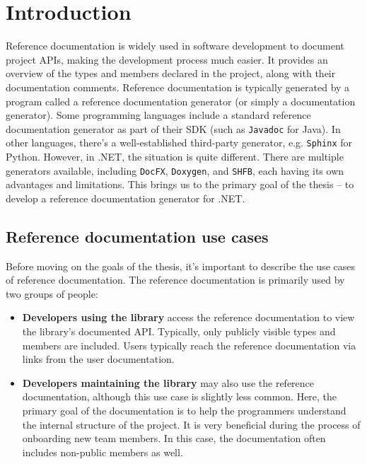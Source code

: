\chapter{Introduction}

Reference documentation is widely used in software development to document project APIs, making the development process much easier.
It provides an overview of the types and members declared in the project, along with their documentation comments.
Reference documentation is typically generated by a program called a reference documentation generator (or simply a documentation generator).
Some programming languages include a standard reference documentation generator as part of their SDK (such as \texttt{Javadoc} for Java). 
In other languages, there's a well-established third-party generator, e.g. \texttt{Sphinx} for Python.
However, in .NET, the situation is quite different.
There are multiple generators available, including \texttt{DocFX}, \texttt{Doxygen}, and \texttt{SHFB}, each having its own advantages and limitations.
This brings us to the primary goal of the thesis -- to develop a reference documentation generator for .NET.

\section{Reference documentation use cases}

Before moving on the goals of the thesis, it's important to describe the use cases of reference documentation.
The reference documentation is primarily used by two groups of people:

\begin{itemize}
    \item \textbf{Developers using the library} access the reference documentation to view the library's documented API. 
    Typically, only publicly visible types and members are included. 
    Users typically reach the reference documentation via links from the user documentation.
    \item \textbf{Developers maintaining the library} may also use the reference documentation, although this use case is slightly less common.
    Here, the primary goal of the documentation is to help the programmers understand the internal structure of the project. 
    It is very beneficial during the process of onboarding new team members. 
    In this case, the documentation often includes non-public members as well.
\end{itemize}

